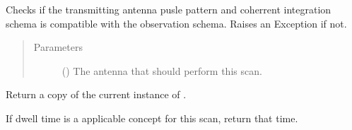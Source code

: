 \documentclass[letterpaper,10pt,english]{sphinxmanual}
\begin{document}
\begin{fulllineitems}
\begin{fulllineitems}
\begin{quote}
\begin{description}
\end{description}\end{quote}

\end{fulllineitems}


\begin{fulllineitems}
\label{\detokenize{modules/radar_scans:radar_scans.RadarScan.check_tx_compatibility}}
Checks if the transmitting antenna pusle pattern and coherrent integration schema is compatible with the observation schema. Raises an Exception if not.
\begin{quote}\begin{description}
\item[{Parameters}] \leavevmode
{} ({\hyperref[\detokenize{modules/antenna:antenna.AntennaTX}]{}}) \textendash{} The antenna that should perform this scan.

\end{description}\end{quote}

\end{fulllineitems}


\begin{fulllineitems}
\label{\detokenize{modules/radar_scans:radar_scans.RadarScan.copy}}
Return a copy of the current instance of {\hyperref[\detokenize{modules/radar_scans:radar_scans.RadarScan}]{}}.

\end{fulllineitems}


\begin{fulllineitems}
\label{\detokenize{modules/radar_scans:radar_scans.RadarScan.dwell_time}}
If dwell time is a applicable concept for this scan, return that time.

\end{fulllineitems}


\end{fulllineitems}
\end{document}
